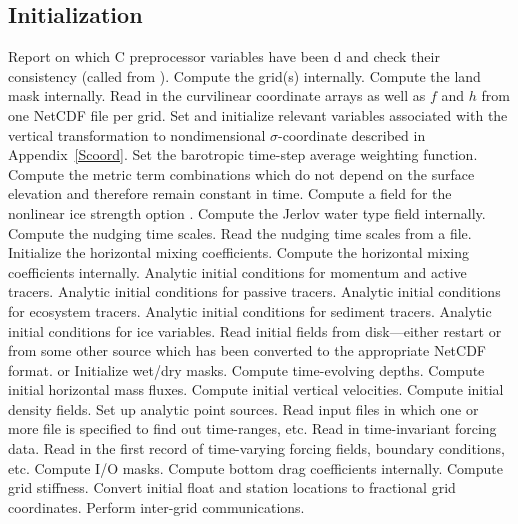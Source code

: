 \subsection{Initialization}
\label{Ini}
   \begin{klist}
     Report on which C preprocessor variables
   have been d and check their consistency (called from
   ).
      Compute the grid(s) internally.
      Compute the land mask internally.
      Read in the curvilinear coordinate arrays as
   well as $f$ and $h$ from one NetCDF file per grid.
       Set and initialize relevant variables
   associated with the vertical transformation to nondimensional
   $\sigma$-coordinate described in Appendix~\ref{Scoord}.
      Set the barotropic time-step average
   weighting function.
        Compute the metric term combinations which do
   not depend on the surface elevation and therefore remain constant in
   time.
      Compute a field for the nonlinear ice
       strength option \citep{Overland_1988}.
      Compute the Jerlov water type field internally.
      Compute the nudging time scales.
      Read the nudging time scales from a file.
      Initialize the horizontal mixing coefficients.
      Compute the horizontal mixing coefficients
     internally.
      Analytic initial conditions for momentum and
       active tracers.
      Analytic initial conditions for passive tracers.
      Analytic initial conditions for ecosystem tracers.
      Analytic initial conditions for sediment tracers.
      Analytic initial conditions for ice variables.
      Read initial fields from disk---either
   restart or from some other source which has been converted to the
   appropriate NetCDF format.
       or  Initialize wet/dry masks.
       Compute time-evolving depths.
       Compute initial horizontal mass fluxes.
       Compute initial vertical velocities.
       Compute initial density fields.
       Set up analytic point sources.
      Read input files in which one or more file
  is specified to find out time-ranges, etc.
      Read in time-invariant forcing data.
      Read in the first record of time-varying forcing
  fields, boundary conditions, etc.
      Compute I/O masks.
      Compute bottom drag coefficients internally.
      Compute grid stiffness.
       Convert initial float and station locations to
     fractional grid coordinates.
      Perform inter-grid communications.
   \end{klist}

